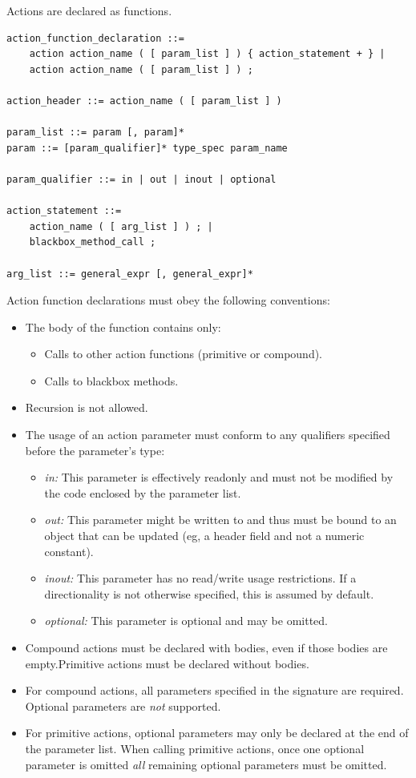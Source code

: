 \documentclass[12pt]{article}
\begin{document}

Actions are declared as functions.

\begin{lstlisting}[style=BNFstyle]
action_function_declaration ::=
    action action_name ( [ param_list ] ) { action_statement + } |
    action action_name ( [ param_list ] ) ;

action_header ::= action_name ( [ param_list ] )

param_list ::= param [, param]*
param ::= [param_qualifier]* type_spec param_name

param_qualifier ::= in | out | inout | optional

action_statement ::= 
    action_name ( [ arg_list ] ) ; |
    blackbox_method_call ;

arg_list ::= general_expr [, general_expr]*

\end{lstlisting}

Action function declarations must obey the following conventions:

\begin{itemize}
\item
The body of the function contains only:
\begin{itemize}
\item
Calls to other action functions (primitive or compound).
\item
Calls to blackbox methods.
\end{itemize}
\item
Recursion is not allowed.
\item
The usage of an action parameter must conform to any qualifiers specified
before the parameter's type:
\begin{itemize}
\item
\textit{in:} This parameter is effectively readonly and must not be modified
by the code enclosed by the parameter list.
\item
\textit{out:} This parameter might be written to and thus must be bound to an
object that can be updated (eg, a header field and not a numeric constant).
\item
\textit{inout:} This parameter has no read/write usage restrictions. If a
directionality is not otherwise specified, this is assumed by default.
\item
\textit{optional:} This parameter is optional and may be omitted.
\end{itemize}
\item
Compound actions must be declared with bodies, even if those bodies are empty.Primitive actions must be declared without bodies.
\item
For compound actions, all parameters specified in the signature are required. 
Optional parameters are \textit{not} supported.
\item
For primitive actions, optional parameters may only be declared at the end of
the parameter list. When calling primitive actions, once one optional parameter
is omitted \textit{all} remaining optional parameters must be omitted.
\end{itemize}
\end{document}
